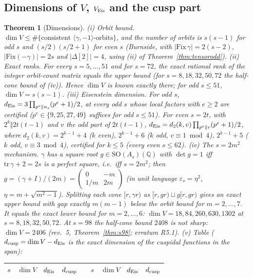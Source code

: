 \documentclass[11pt]{article}
\newtheorem{theorem}{Theorem}[section]
\theoremstyle{definition}
\theoremstyle{plain}
\newcommand{\Q}{\mathbb{Q}}
\begin{document}
\subsection{Dimensions of $V$, $V_{\rm Eis}$ and the cusp part}
\begin{theorem}[Dimensions]\label{thm:dims}
(i) \emph{Orbit bound.} $\dim V\le\#\{\text{consistent }\langle\gamma,-1\rangle\text{-orbits}\}$, and the number of orbits is $s(s-1)$ for odd $s$ and
$(s/2)(s/2+1)$ for even $s$ (Burnside, with $|\mathrm{Fix}\,\gamma|=2(s-2)$, $|\mathrm{Fix}(-\gamma)|=2s$ and $|\Delta[2]|=4$, using (ii) of Theorem~\ref{thm:tensorodd}).
(ii) \emph{Exact ranks.} For every $s=5,\dots,51$ and for $s=72$, the exact rational rank of the integer orbit-count matrix equals the upper bound
(for $s=8,18,32,50,72$ the half-cone bound of (iv)). Hence $\dim V$ is known exactly there; for odd $s\le51$, $\dim V=s(s-1)$.
(iii) \emph{Eisenstein dimension.} For odd $s$, $d_{\rm Eis}=3\prod_{p^e\Vert n_s}(p^e+1)/2$, at every odd $s$ whose local factors with $e\ge2$ are certified
($p^e\in\{9,25,27,49\}$ suffices for odd $s\le51$). For even $s=2t$, with $2^k\Vert2t(t-1)$ and $v$ the odd part of $2t(t-1)$,
$d_{\rm Eis}=d_2(k,v)\prod_{p^e\Vert v}(p^e+1)/2$, where $d_2(k,v)=2^{k-1}+4$ ($k$ even), $2^{k-1}+6$ ($k$ odd, $v\equiv1\bmod4$), $2^{k-1}+5$ ($k$ odd,
$v\equiv3\bmod4$), certified for $k\le5$ (every even $s\le62$).
(iv) \emph{The $s=2m^2$ mechanism.} $\gamma$ has a square root $g\in\mathrm{SO}(A_s)(\Q)$ with $\det g=1$ iff $\mathrm{tr}\,\gamma+2=2s$ is a perfect square, i.e.\ iff
$s=2m^2$; then $g=(\gamma+I)/(2m)=\begin{pmatrix}0&-m\\1/m&2m\end{pmatrix}$ (in unit language $\varepsilon_s=\eta^2$, $\eta=m+\sqrt{m^2-1}$). Splitting each cone
$[r,\gamma r)$ as $[r,gr)\sqcup g[r,gr)$ gives an exact upper bound with gap exactly $m(m-1)$ below the orbit bound for $m=2,\dots,7$. It equals the exact lower
bound for $m=2,\dots,6$: $\dim V=18,84,260,630,1302$ at $s=8,18,32,50,72$. At $s=98$ the half-cone bound $2408$ is not sharp: $\dim V=2406$ (rev.~5, Theorem~\ref{thm:s98}; erratum R5.1).
(v) \emph{Table} ($d_{\rm cusp}=\dim V-d_{\rm Eis}$ is the exact dimension of the cuspidal functions in the span):
\begin{center}\small
\begin{longtable}{rrrrcrrrr}\toprule
$s$ & $\dim V$ & $d_{\rm Eis}$ & $d_{\rm cusp}$ && $s$ & $\dim V$ & $d_{\rm Eis}$ & $d_{\rm cusp}$\\\midrule\endhead

\end{longtable}
\end{center}
\end{theorem}
\end{document}
